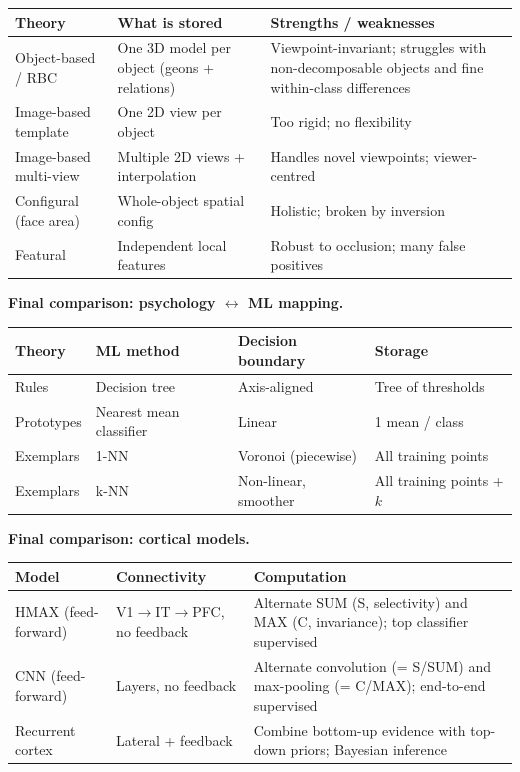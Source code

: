 \begin{center}
\renewcommand{\arraystretch}{1.3}
\begin{tabular}{@{} l p{4.2cm} p{5.5cm} @{}}
\toprule
\textbf{Theory} & \textbf{What is stored} & \textbf{Strengths / weaknesses} \\
\midrule
Object-based / RBC   & One 3D model per object (geons + relations) & Viewpoint-invariant; struggles with non-decomposable objects and fine within-class differences \\
Image-based template & One 2D view per object & Too rigid; no flexibility \\
Image-based multi-view & Multiple 2D views + interpolation & Handles novel viewpoints; viewer-centred \\
Configural (face area) & Whole-object spatial config & Holistic; broken by inversion \\
Featural               & Independent local features & Robust to occlusion; many false positives \\
\bottomrule
\end{tabular}
\end{center}

\textbf{Final comparison: psychology $\leftrightarrow$ ML mapping.}

\begin{center}
\renewcommand{\arraystretch}{1.3}
\begin{tabular}{@{} l l l l @{}}
\toprule
\textbf{Theory} & \textbf{ML method} & \textbf{Decision boundary} & \textbf{Storage} \\
\midrule
Rules      & Decision tree              & Axis-aligned          & Tree of thresholds \\
Prototypes & Nearest mean classifier    & Linear                & 1 mean / class \\
Exemplars  & 1-NN                       & Voronoi (piecewise)   & All training points \\
Exemplars  & k-NN                       & Non-linear, smoother  & All training points + $k$ \\
\bottomrule
\end{tabular}
\end{center}

\textbf{Final comparison: cortical models.}

\begin{center}
\renewcommand{\arraystretch}{1.3}
\begin{tabular}{@{} l l p{6cm} @{}}
\toprule
\textbf{Model} & \textbf{Connectivity} & \textbf{Computation} \\
\midrule
HMAX (feed-forward) & V1$\rightarrow$IT$\rightarrow$PFC, no feedback & Alternate SUM (S, selectivity) and MAX (C, invariance); top classifier supervised \\
CNN (feed-forward)  & Layers, no feedback                         & Alternate convolution (= S/SUM) and max-pooling (= C/MAX); end-to-end supervised \\
Recurrent cortex    & Lateral + feedback                          & Combine bottom-up evidence with top-down priors; Bayesian inference \\
\bottomrule
\end{tabular}
\end{center}

